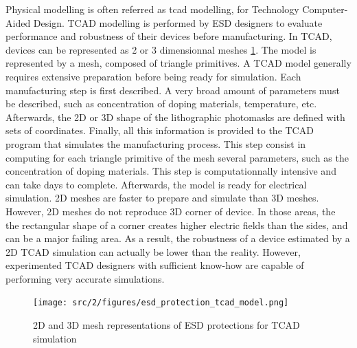Physical modelling is often referred as \gls{tcad} modelling, for Technology Computer-Aided Design.
TCAD modelling is performed by ESD designers to evaluate performance and robustness of their devices before manufacturing.
In TCAD, devices can be represented as 2 or 3 dimensionnal meshes \ref{fig:esd-protection-tcad-model}.
The model is represented by a mesh, composed of triangle primitives.
A TCAD model generally requires extensive preparation before being ready for simulation.
Each manufacturing step is first described.
A very broad amount of parameters must be described, such as concentration of doping materials, temperature, etc.
Afterwards, the 2D or 3D shape of the lithographic photomasks are defined with sets of coordinates.
Finally, all this information is provided to the TCAD program that simulates the manufacturing process.
This step consist in computing for each triangle primitive of the mesh several parameters, such as the concentration of doping materials.
This step is computationnally intensive and can take days to complete.
Afterwards, the model is ready for electrical simulation.
2D meshes are faster to prepare and simulate than 3D meshes.
However, 2D meshes do not reproduce 3D corner of device.
In those areas, the the rectangular shape of a corner creates higher electric fields than the sides, and can be a major failing area.
As a result, the robustness of a device estimated by a 2D TCAD simulation can actually be lower than the reality.
However, experimented TCAD designers with sufficient know-how are capable of performing very accurate simulations.

\begin{figure}[!h]
  \centering
  \texttt{[image: src/2/figures/esd\_protection\_tcad\_model.png]}
  \caption{2D and 3D mesh representations of ESD protections for TCAD simulation}
  \label{fig:esd-protection-tcad-model}
\end{figure}

